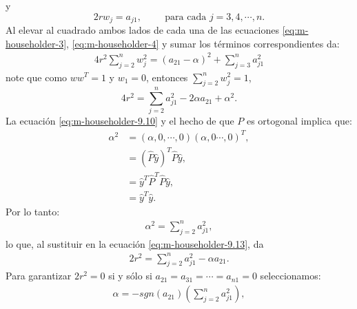 y
\begin{equation}\label{eq:m-householder-4}
  2rw_j=a_{j1},\hspace{1cm}\text{para cada }j=3,4,\cdots,n.
\end{equation}
Al elevar al cuadrado ambos lados de cada una de las ecuaciones \ref{eq:m-householder-3}, \ref{eq:m-householder-4} y sumar los términos correspondientes da:
\begin{align*}
  4r^2\sum_{j=2}^{n}w_j^2=(a_{21}-\alpha)^{2}+\sum_{j=3}^{n}a_{j1}^{2}
\end{align*}
note que como $ww^{T}=1$ y $w_1=0$, entonces $\sum_{j=2}^{n}w_{j}^{2}=1$,
\begin{equation}\label{eq:m-householder-9.13}
  4r^{2}=\sum_{j=2}^{n}a_{j1}^{2}-2\alpha a_{21}+\alpha^2.
\end{equation}
La ecuación \ref{eq:m-householder-9.10} y el hecho de que $P$ es ortogonal implica que:
\begin{align*}
  \alpha^2&=(\alpha,0,\cdots,0)(\alpha,0\cdots,0)^{T},\\
  &=(\hat{P}\hat{y})^{T}\hat{P}\hat{y},\\
  &=\hat{y}^{T}\hat{P}^{T}\hat{P}\hat{y},\\
  &=\hat{y}^T\hat{y}.
\end{align*}
Por lo tanto:
\begin{align*}
  \alpha^{2}=\sum_{j=2}^{n}a_{j1}^{2},
\end{align*}
lo que, al sustituir en la ecuación \ref{eq:m-householder-9.13}, da
\begin{align*}
  2r^{2}=\sum_{j=2}^{n}a_{j1}^2-\alpha a_{21}.
\end{align*}
Para garantizar $2r^2=0$ si y sólo si $a_{21}=a_{31}=\cdots=a_{n1}=0$ seleccionamos:
\begin{align*}
  \alpha=-sgn(a_{21})\left( \sum_{j=2}^{n}a_{j1}^{2} \right),
\end{align*}

















